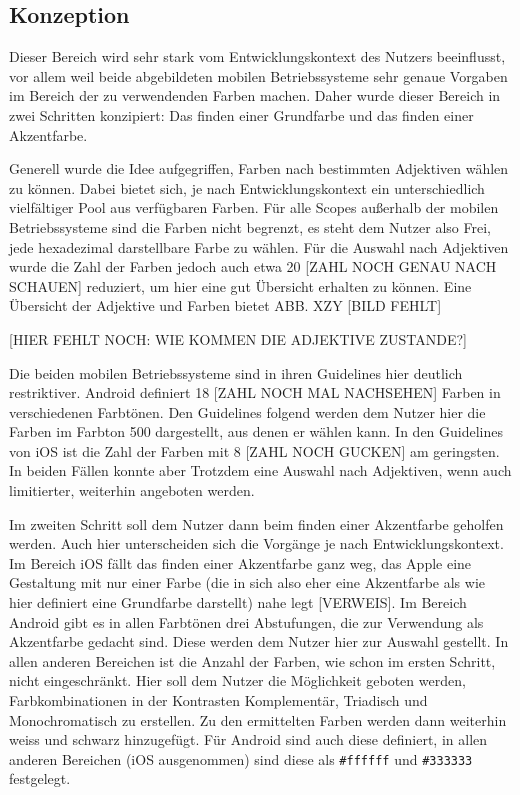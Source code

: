 \subsection{Konzeption}
Dieser Bereich wird sehr stark vom Entwicklungskontext des Nutzers beeinflusst, vor allem weil beide abgebildeten mobilen Betriebssysteme sehr genaue Vorgaben im Bereich der zu verwendenden Farben machen.
Daher wurde dieser Bereich in zwei Schritten konzipiert: Das finden einer Grundfarbe und das finden einer Akzentfarbe.

Generell wurde die Idee aufgegriffen, Farben nach bestimmten Adjektiven wählen zu können. Dabei bietet sich, je nach Entwicklungskontext ein unterschiedlich vielfältiger Pool aus verfügbaren Farben.
Für alle Scopes außerhalb der mobilen Betriebssysteme sind die Farben nicht begrenzt, es steht dem Nutzer also Frei, jede hexadezimal darstellbare Farbe zu wählen. Für die Auswahl nach Adjektiven wurde die Zahl der Farben jedoch auch etwa 20 [ZAHL NOCH GENAU NACH SCHAUEN] reduziert, um hier eine gut Übersicht erhalten zu können. Eine Übersicht der Adjektive und Farben bietet ABB. XZY [BILD FEHLT]

[HIER FEHLT NOCH: WIE KOMMEN DIE ADJEKTIVE ZUSTANDE?]

Die beiden mobilen Betriebssysteme sind in ihren Guidelines hier deutlich restriktiver. Android definiert 18 [ZAHL NOCH MAL NACHSEHEN] Farben in verschiedenen Farbtönen. Den Guidelines folgend werden dem Nutzer hier die Farben im Farbton 500 dargestellt, aus denen er wählen kann.
In den Guidelines von iOS ist die Zahl der Farben mit 8 [ZAHL NOCH GUCKEN] am geringsten.
In beiden Fällen konnte aber Trotzdem eine Auswahl nach Adjektiven, wenn auch limitierter, weiterhin angeboten werden.

Im zweiten Schritt soll dem Nutzer dann beim finden einer Akzentfarbe geholfen werden. Auch hier unterscheiden sich die Vorgänge je nach Entwicklungskontext.
Im Bereich iOS fällt das finden einer Akzentfarbe ganz weg, das Apple eine Gestaltung mit nur einer Farbe (die in sich also eher eine Akzentfarbe als wie hier definiert eine Grundfarbe darstellt) nahe legt [VERWEIS].
Im Bereich Android gibt es in allen Farbtönen drei Abstufungen, die zur Verwendung als Akzentfarbe gedacht sind. Diese werden dem Nutzer hier zur Auswahl gestellt.
In allen anderen Bereichen ist die Anzahl der Farben, wie schon im ersten Schritt, nicht eingeschränkt.  Hier soll dem Nutzer die Möglichkeit geboten werden, Farbkombinationen in der Kontrasten Komplementär, Triadisch und Monochromatisch zu erstellen.
Zu den ermittelten Farben werden dann weiterhin weiss und schwarz hinzugefügt. Für Android sind auch diese definiert, in allen anderen Bereichen (iOS ausgenommen) sind diese als \verb|#ffffff| und \verb|#333333| festgelegt.

